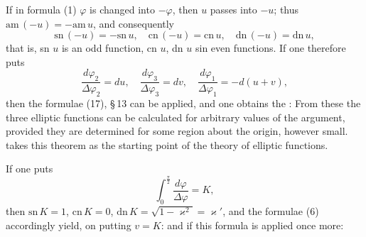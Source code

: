 
If in formula (1) $\varphi$ is changed into $-\varphi$, then $u$ passes into $-u$; thus $\mathrm{am}\,(-u) = -\mathrm{am}\,u$, and consequently
\[
\mathrm{sn}\,(-u) = -\mathrm{sn}\,u,\quad \mathrm{cn}\,(-u) = \mathrm{cn}\,u,\quad \mathrm{dn}\,(-u) = \mathrm{dn}\,u,
\]
that is, sn $u$ is an odd function, cn $u$, dn $u$ sin even functions. %
If one therefore puts
\[
\frac{d\varphi_2}{\Delta\varphi_2} = du,\quad \frac{d\varphi_3}{\Delta\varphi_3} = dv,\quad \frac{d\varphi_1}{\Delta\varphi_1} = -d(u+v),
\]
then the formulae (17), §\,13 can be applied, and one obtains the :
From these the three elliptic functions can be calculated  for arbitrary values of the argument, provided they are determined for some region about the origin, however small.  takes this theorem as the starting point of the theory of elliptic functions.

If one puts
\[
\int_0^{\frac{\pi}{2}} \frac{d\varphi}{\Delta\varphi} = K,
\]
then $\mathrm{sn}\,K = 1$, $\mathrm{cn}\,K = 0$, $\mathrm{dn}\,K = \sqrt{1-\varkappa^2} = \varkappa'$, and the formulae (6) accordingly yield, on putting $v = K$:
and if this formula is applied once more:
